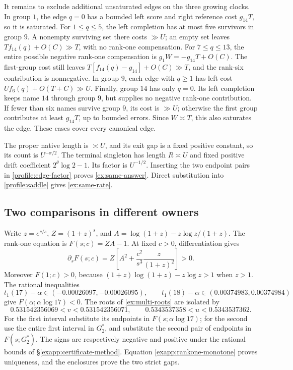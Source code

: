 It remains to exclude additional unsaturated edges on the three
growing clocks.  In group \(1\), the edge \(q=0\) has a bounded
left score and right reference cost \(g_{14}T\), so it is saturated.
For \(1\le q\le5\), the left completion has at most five survivors
in group \(9\).  A nonempty surviving set there costs \(\gg U\);
an empty set leaves \(Tf_{14}(q)+O(C)\gg T\), with no rank-one
compensation.  For \(7\le q\le13\), the entire possible negative
rank-one compensation is \(g_1W=-g_{14}T+O(C)\).
The first-group cost still leaves
\(T[f_{14}(q)-g_{14}]+O(C)\gg T\), and the rank-six contribution
is nonnegative.  In group \(9\), each edge with \(q\ge1\) has
left cost \(Uf_6(q)+O(T+C)\gg U\).  Finally, group \(14\) has
only \(q=0\).  Its left completion keeps name \(14\) through
group \(9\), but supplies no negative rank-one contribution.
If fewer than six names survive group \(9\), its cost is
\(\gg U\); otherwise the first group contributes at least
\(g_{14}T\), up to bounded errors.  Since \(W\asymp T\), this
also saturates the edge.  These cases cover every canonical edge.

The proper native length is \(\asymp U\), and its exit gap is a
fixed positive constant, so its count is \(U^{-\sigma/2}\).
The terminal singleton has length \(R\asymp U\) and fixed positive
drift coefficient \(2^\theta\log2-1\).  Its factor is
\(U^{-1/2}\).  Inserting the two endpoint pairs in
\eqref{profile:edge-factor} proves \eqref{ex:same-answer}.
Direct substitution into \eqref{profile:saddle} gives
\eqref{ex:same-rate}.

\subsection{Two comparisons in different owners}

Write \(z=e^{c/s}\), \(Z=(1+z)^s\), and
\(A=\log(1+z)-z\log z/(1+z)\).  The rank-one equation is
\(F(s;c)=ZA-1\).  At fixed \(c>0\), differentiation gives
\begin{equation}
 \partial_sF(s;c)=Z\left[A^2+
               \frac{c^2}{s^3}\frac{z}{(1+z)^2}\right]>0.
 \label{exapp:rankone-monotone}
\end{equation}
Moreover \(F(1;c)>0\), because
\((1+z)\log(1+z)-z\log z>1\) when \(z>1\).
The rational inequalities
\[
 t_1(17)-\alpha\in(-0.00026097,-0.00026095),\qquad
 t_1(18)-\alpha\in(0.00374983,0.00374984)
\]
give \(F(\alpha;\alpha\log17)<0\).  The roots of
\eqref{ex:multi-roots} are isolated by
\begin{equation}
 0.531542356069<v<0.531542356071,\qquad
 0.5343537358<u<0.5343537362.
 \label{exapp:multi-root-bounds}
\end{equation}
For the first interval substitute its endpoints in
\(F(s;\alpha\log17)\); for the second use the entire first
interval in \(G_2^*\), and substitute the second pair of endpoints
in \(F(s;G_2^*)\).  The signs are respectively negative and positive
under the rational bounds of \S\ref{exapp:certificate-method}.
Equation \eqref{exapp:rankone-monotone} proves uniqueness, and the
enclosures prove the two strict gaps.


